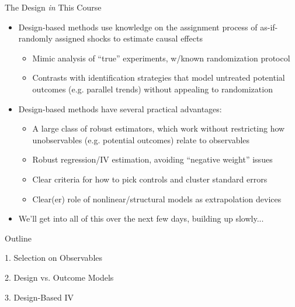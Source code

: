 \documentclass[11pt,english]{beamer}
\begin{document}
\begin{frame}{The Design \emph{in} This Course}

\begin{itemize}
\item Design-based methods use knowledge on the assignment process of as-if-randomly assigned shocks to estimate causal effects \smallskip
\begin{itemize}
\item Mimic analysis of ``true'' experiments, w/known randomization protocol\smallskip
\item Contrasts with identification strategies that model untreated potential outcomes (e.g. parallel trends) without appealing to randomization
\end{itemize}\bigskip\pause{}
\item Design-based methods have several practical advantages:\smallskip
\begin{itemize}
\item A large class of robust estimators, which work without restricting how unobservables (e.g. potential outcomes) relate to observables\smallskip\pause{}
\item Robust regression/IV estimation, avoiding ``negative weight'' issues \smallskip\pause{}
\item Clear criteria for how to pick controls and cluster standard errors\smallskip\pause{}
\item Clear(er) role of nonlinear/structural models as extrapolation devices
\end{itemize}\bigskip\pause{}
\item We'll get into all of this over the next few days, building up slowly...
\end{itemize}

\end{frame}

\begin{frame}{Outline}

1. Selection on Observables
\vspace{0.8cm}

2. Design vs. Outcome Models
\vspace{0.8cm}

3. Design-Based IV

\end{frame}
\end{document}
